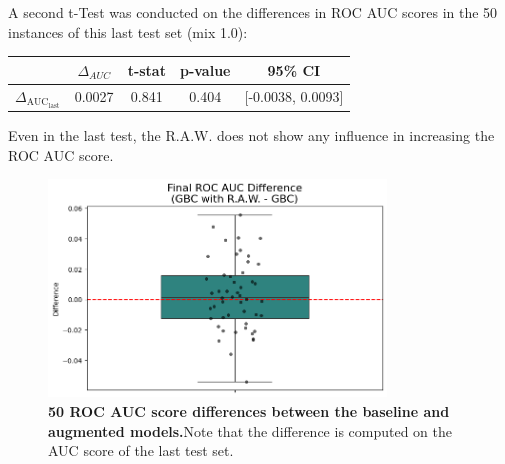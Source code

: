 A second t-Test was conducted on the differences in ROC AUC scores in the 50 instances of this last test set (mix 1.0):


\begin{table}[H]
    \centering
    \begin{tabular}{lcccc}
        \toprule
        & $\Delta_{AUC}$ & t-stat & p-value & 95\% CI \\
        \midrule
        $\Delta_{\text{AUC}_{\text{last}}}$ & 0.0027 & 0.841 & 0.404 & [-0.0038, 0.0093] \\
        \bottomrule
    \end{tabular}
\end{table}

Even in the last test, the R.A.W. does not show any influence in increasing the ROC AUC score.

\begin{figure}[H]
    \centering
    \includegraphics[width=0.8\textwidth]{assets/RealRawDiffLAST.png} 
    \caption{\textbf{50 ROC AUC score differences between the baseline and augmented models.}Note that the difference is computed on the AUC score of the last test set.}
\end{figure}








